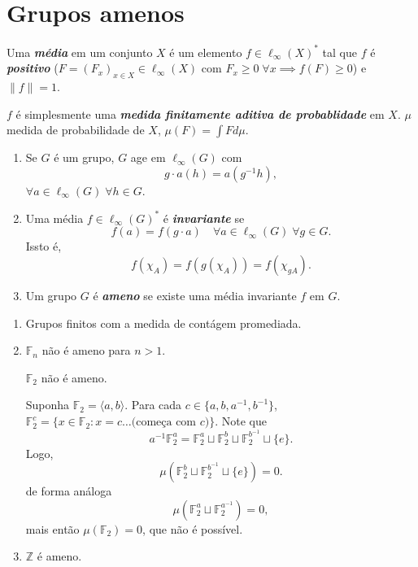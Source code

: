 \documentclass[portuguese]{article}
\theoremstyle{definition}
\newcommand{\Z}{\mathbb{Z}}
\begin{document}
\section{Grupos amenos}
\begin{defn}
	Uma \textbf{\textit{média}} em um conjunto $X$ é um elemento $f\in \ell_\infty(X)^*$ tal que $f$ é \textbf{\textit{positivo}} ($F=(F_x)_{x\in X}\in\ell_\infty(X)$ com $F_x\geq0\;\forall x\implies f(F)\geq0$) e $\|f\|=1$.
\end{defn}
\begin{exer*}
	$f$ é simplesmente uma \textbf{\textit{medida finitamente aditiva de probablidade}} em $X$. $\mu$ medida de probabilidade de $X$, $\mu(F)=\int Fd\mu$.
\end{exer*}
\begin{defn}\leavevmode
	\begin{enumerate}
	\item Se $G$ é um grupo, $G$ age em $\ell_\infty(G)$ com
	\[g\cdot a(h)=a(g^{-1}h),\]
	$\forall a\in\ell_\infty(G)\;\forall h\in G$.

	\item Uma média $f\in\ell_\infty(G)^*$ é \textbf{\textit{invariante}} se
	\[f(a)=f(g\cdot a)\quad\forall a\in\ell_\infty(G)\;\forall g\in G.\]
	Issto é,
	\[f(\chi_A)=f(g(\chi_A))=f(\chi_{gA}).\]
	
	\item Um grupo $G$ é \textbf{\textit{ameno}} se existe uma média invariante $f$ em $G$.
	\end{enumerate}
\end{defn}
\begin{exemplos}\leavevmode
	\begin{enumerate}
		\item Grupos finitos com a medida de contágem promediada.
		\item $\mathbb{F}_n$ não é ameno para $n>1$.
		\begin{af*}
			$\mathbb{F}_2$ não é ameno.
		\end{af*}
		Suponha $\mathbb{F}_2=\langle a,b\rangle$. Para cada $c\in\{a,b,a^{-1},b^{-1}\}$, $\mathbb{F}^c_2=\{x\in\mathbb{F}_2:x=c\ldots\text{(começa com }c\text{)}\}$. Note que
		\[a^{-1}\mathbb{F}_2^a=\mathbb{F}_2^a\sqcup\mathbb{F}_2^b\sqcup\mathbb{F}_2^{b^{-1}}\sqcup\{e\}.\]
		Logo,
		\[\mu(\mathbb{F}_2^b\sqcup\mathbb{F}_2^{b^{-1}}\sqcup\{e\})=0.\]
		de forma análoga
		\[\mu(\mathbb{F}^a_2\sqcup\mathbb{F}^{a^{-1}}_2)=0,\]
		mais então $\mu(\mathbb{F}_2)=0$, que não é possível.
		\item {\color{orange}$\Z$ é ameno}.
	\end{enumerate}
\end{exemplos}
\end{document}
